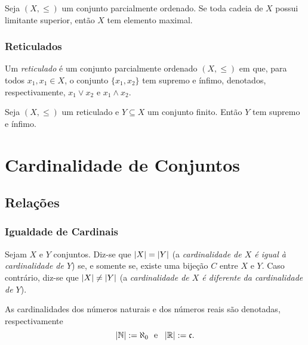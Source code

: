 \begin{lema}
	Seja $(X,\leq)$ um conjunto parcialmente ordenado. Se toda cadeia de $X$ possui limitante superior, então $X$ tem elemento maximal.
\end{lema}

\subsection{Reticulados}

\begin{defi}
	Um \emph{reticulado} é um conjunto parcialmente ordenado $(X,\leq)$ em que, para todos $x_1, x_1 \in X$, o conjunto $\{x_1,x_2\}$ tem supremo e ínfimo, denotados, respectivamente, $x_1 \vee x_2$ e $x_1 \wedge x_2$.
\end{defi}

\begin{prop}
	Seja $(X,\leq)$ um reticulado e $Y \subseteq X$ um conjunto finito. Então $Y$ tem supremo e ínfimo.
\end{prop}













\chapter{Cardinalidade de Conjuntos}

\section{Relações}

\subsection{Igualdade de Cardinais}

\begin{defi}
	Sejam $X$ e $Y$ conjuntos. Diz-se que $\left\vert{X}\right\vert = \left\vert{Y}\right\vert$ (a \emph{cardinalidade de $X$ é igual à cardinalidade de $Y$}) se, e somente se, existe uma bijeção $C$ entre $X$ e $Y$. Caso contrário, diz-se que $\left\vert{X}\right\vert \neq \left\vert{Y}\right\vert$ (a \emph{cardinalidade de $X$ é diferente da cardinalidade de $Y$}).

	As cardinalidades dos números naturais e dos números reais são denotadas, respectivamente
	\begin{equation*}
	\left\vert{\mathbb{N}}\right\vert := \aleph_0 \text{\ \ e\ \ } \left\vert{\mathbb{R}}\right\vert := \mathfrak c.
	\end{equation*}
\end{defi}


